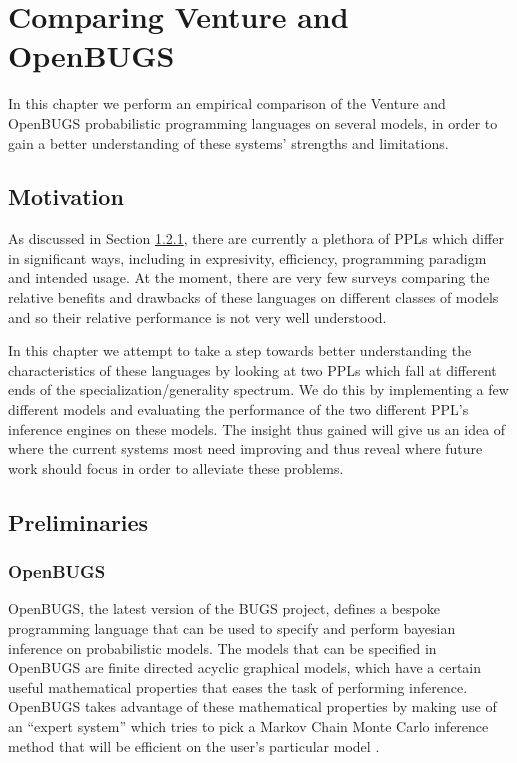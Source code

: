 \chapter{Comparing Venture and OpenBUGS}
\label{chap:perfComp}

In this chapter we perform an empirical comparison of the Venture and OpenBUGS probabilistic programming languages on several models, in order to gain a better understanding of these systems' strengths and limitations.

\section{Motivation}

As discussed in Section \ref{}, there are currently a plethora of PPLs which differ in significant ways, including in expresivity, efficiency, programming paradigm and intended usage.  At the moment, there are very few surveys comparing the relative benefits and drawbacks of these languages on different classes of models and so their relative performance is not very well understood. 

In this chapter we attempt to take a step towards better understanding the characteristics of these languages by looking at two PPLs which fall at different ends of the specialization/generality spectrum. We do this by implementing a few different models and evaluating the performance of the two different PPL's inference engines on these models. The insight thus gained will give us an idea of where the current systems most need improving and thus reveal where future work should focus in order to alleviate these problems.

\section{Preliminaries}
\subsection{OpenBUGS}

OpenBUGS, the latest version of the BUGS project, defines a bespoke programming language that can be used to specify and perform bayesian inference on probabilistic models. The models that can be specified in OpenBUGS are finite directed acyclic graphical models, which have a certain useful mathematical properties that eases the task of performing inference. OpenBUGS takes advantage of these mathematical properties by making use of an ``expert system'' which tries to pick a Markov Chain Monte Carlo inference method that will be efficient on the user's particular model \cite{bugsOverview}.


